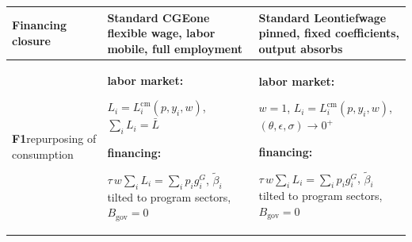 \begin{table}[htbp]
\centering
\footnotesize
\setlength{\tabcolsep}{4pt}
\setlength{\parindent}{0pt}
\setlength{\parskip}{0pt}
\renewcommand{\arraystretch}{1.3}
\newcommand{\tblk}[1]{\textbf{#1:}}
\newcommand{\tcond}[1]{\par\hspace{1em}#1}
\begin{tabular}{@{}>{\raggedright\arraybackslash}p{2.2cm}
                  >{\raggedright\arraybackslash}p{6.2cm}
                  >{\raggedright\arraybackslash}p{6.2cm}@{}}
\toprule
\textbf{Financing closure}
& \textbf{Standard CGE}\newline \scriptsize one flexible wage, labor mobile, full employment
& \textbf{Standard Leontief}\newline \scriptsize wage pinned, fixed coefficients, output absorbs \\
\midrule
\textbf{F1}\newline \scriptsize repurposing of consumption
& \tblk{labor market}\tcond{$L_{i} = L_{i}^{\mathrm{cm}}(p, y_{i}, w)$, \quad $\textstyle\sum_{i} L_{i} = \bar L$}\par
  \vspace{6pt}
  \tblk{financing}\tcond{$\tau\, w\sum_{i} L_{i} = \textstyle\sum_{i} p_{i} g^{G}_{i}$, \quad $\tilde\beta_{i}$ tilted to program sectors, \quad $B_{\mathrm{gov}} = 0$}
& \tblk{labor market}\tcond{$w = 1$, \quad $L_{i} = L_{i}^{\mathrm{cm}}(p, y_{i}, w)$, \quad $(\theta, \epsilon, \sigma) \to 0^{+}$}\par
  \vspace{6pt}
  \tblk{financing}\tcond{$\tau\, w\sum_{i} L_{i} = \textstyle\sum_{i} p_{i} g^{G}_{i}$, \quad $\tilde\beta_{i}$ tilted to program sectors, \quad $B_{\mathrm{gov}} = 0$} \\

\end{tabular}
\end{table}
